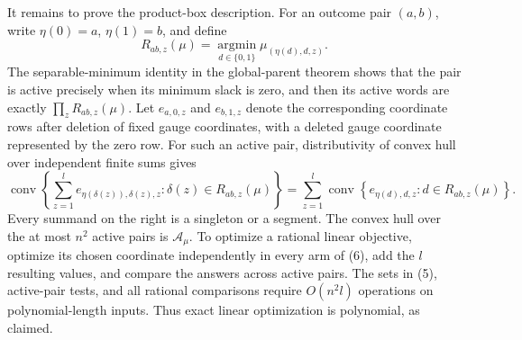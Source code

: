 It remains to prove the product-box description. For an outcome pair \((a,b)\), write \(\eta(0)=a\), \(\eta(1)=b\), and define
\[R_{ab,z}(\mu)=\operatorname*{argmin}_{d\in\{0,1\}}\mu_{(\eta(d),d,z)}.\tag{5}\]
The separable-minimum identity in the global-parent theorem shows that the pair is active precisely when its minimum slack is zero, and then its active words are exactly \(\prod_zR_{ab,z}(\mu)\). Let \(e_{a,0,z}\) and \(e_{b,1,z}\) denote the corresponding coordinate rows after deletion of fixed gauge coordinates, with a deleted gauge coordinate represented by the zero row. For such an active pair, distributivity of convex hull over independent finite sums gives
\[\operatorname{conv}\left\{\sum_{z=1}^le_{\eta(\delta(z)),\delta(z),z}:\delta(z)\in R_{ab,z}(\mu)\right\}
=\sum_{z=1}^l\operatorname{conv}\left\{e_{\eta(d),d,z}:d\in R_{ab,z}(\mu)\right\}.\tag{6}\]
Every summand on the right is a singleton or a segment. The convex hull over the at most \(n^2\) active pairs is \(\mathcal A_\mu\). To optimize a rational linear objective, optimize its chosen coordinate independently in every arm of (6), add the \(l\) resulting values, and compare the answers across active pairs. The sets in (5), active-pair tests, and all rational comparisons require \(O(n^2l)\) operations on polynomial-length inputs. Thus exact linear optimization is polynomial, as claimed.